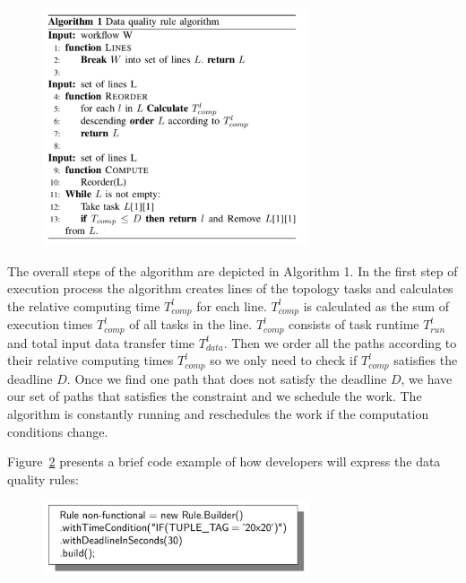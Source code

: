 \begin{figure}[h!]
  \centering
  \includegraphics[width=0.7\textwidth]{Figures/Algorithm.pdf}
  \label{fig:Algorithm}
\end{figure}

The overall steps of the algorithm are depicted in Algorithm 1. In the first step of execution process the algorithm creates lines of the topology tasks and calculates the relative computing time $T_{comp}^l$ for each line. $T_{comp}^l$ is calculated as the sum of execution times $T_{comp}^l$ of all tasks in the line. $T_{comp}^l$ consists of task runtime $T_{run}^t$ and total input data transfer time $T_{data}^t$. Then we order all the paths according to their relative computing times $T_{comp}^l$ so we only need to check if $T_{comp}^l$ satisfies the deadline $D$. Once we find one path that does not satisfy the deadline $D$, we have our set of paths that satisfies the constraint and we schedule the work. The algorithm is constantly running and reschedules the work if the computation conditions change.

Figure~\ref{fig:qosRule} presents a brief code example of how developers will express the data quality rules:

\begin{figure}[h!]
  \centering
  \includegraphics[width=0.7\textwidth]{Figures/qosRule.pdf}
  \caption{}\label{fig:qosRule}
\end{figure}

